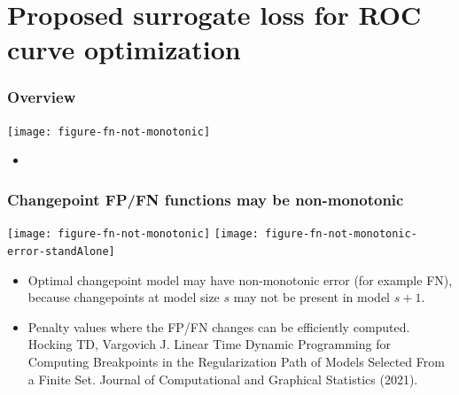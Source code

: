 \documentclass[t]{beamer}
\begin{document}
\section{Proposed surrogate loss for ROC curve optimization}

\begin{frame}
  \frametitle{Overview}

  \texttt{[image: figure-fn-not-monotonic]}

\begin{itemize}
\item 
\end{itemize}
\end{frame}


\begin{frame}
  \frametitle{Changepoint FP/FN functions may be non-monotonic}

  \texttt{[image: figure-fn-not-monotonic]}
  \texttt{[image: figure-fn-not-monotonic-error-standAlone]}

\begin{itemize}
\item Optimal changepoint model may have non-monotonic error (for example
  FN), because changepoints at model size $s$ may not be present in
  model $s+1$.
\item Penalty values where the FP/FN changes can be efficiently
  computed. Hocking TD, Vargovich J. Linear Time Dynamic Programming
  for Computing Breakpoints in the Regularization Path of Models
  Selected From a Finite Set. Journal of Computational and Graphical
  Statistics (2021).
\end{itemize}
\end{frame}
\end{document}

